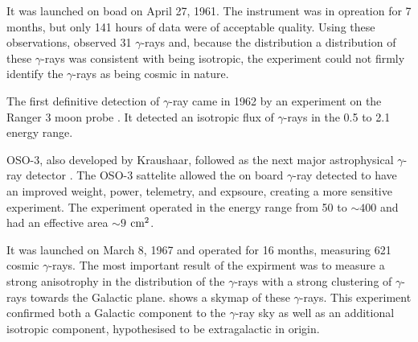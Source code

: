 
It was launched on boad \explorerxi on April 27,
1961. The instrument was in opreation for 7 months, but only 141 hours
of data were of acceptable quality.  Using these observations, \explorerxi
observed 31 $\gamma$-rays and, because the distribution a distribution of
these $\gamma$-rays was consistent with being isotropic, the experiment
could not firmly identify the $\gamma$-rays as being cosmic in nature.





The first definitive detection of $\gamma$-ray came in
1962 by an experiment on the Ranger 3 moon
probe \citep{arnold_1962_gamma-space}.  It detected an isotropic flux
of $\gamma$-rays in the 0.5 \mev to 2.1 \mev energy range.

\ac{OSO-3}, also developed by Kraushaar, followed \explorerxi
as the next major astrophysical $\gamma$-ray detector
\cite{kraushaar_1972_high-energy-cosmic}.  The \ac{OSO-3} sattelite
allowed the on board $\gamma$-ray detected to have an improved weight,
power, telemetry, and expsoure, creating a more sensitive experiment.
The experiment operated in the energy range from 50 \mev to $\sim 400$
\mev and had an effective area $\sim 9$ $\text{cm}^2$.

It was launched on March 8, 1967 and operated for 16 months, measuring
621 cosmic $\gamma$-rays.  The most important result of the expirment was
to measure a strong anisotrophy in the distribution of the $\gamma$-rays
with a strong clustering of $\gamma$-rays towards the Galactic plane.
 shows a skymap of these $\gamma$-rays.  This
experiment confirmed both a Galactic component to the $\gamma$-ray
sky as well as an additional isotropic component, hypothesised to be
extragalactic in origin.


